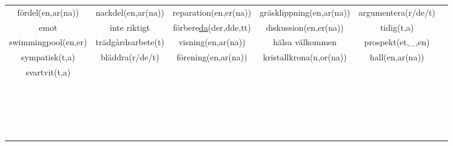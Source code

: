 \begin{center}
\begin{adjustwidth}{-2.5cm}{}
\begin{tabular}{|c c c c c c|}
            fördel(en,ar(na)) & nackdel(en,ar(na)) & reparation(en,er(na)) & gräsklippning(en,ar(na)) & argumentera(r/de/t) &  \\
            emot & inte riktigt & förbere\underline{da}(der,dde,tt) & diskussion(en,er(na)) & tidig(t,a) &  \\
            swimmingpool(en,er) & trädgårdsarbete(t) & visning(en,ar(na)) & hälsa välkommen & prospekt(et,\_,en) &  \\
            sympatisk(t,a) & bläddra(r/de/t) & förening(en,ar(na)) & kristallkrona(n,or(na)) & hall(en,ar(na)) &  \\
            svartvit(t,a) &  &  &  &  &  \\
             &  &  &  &  &  \\
             &  &  &  &  &  \\
             &  &  &  &  &  \\
             &  &  &  &  &  \\
             &  &  &  &  &  \\
             &  &  &  &  &  \\
             &  &  &  &  &  \\
             &  &  &  &  &  \\
             &  &  &  &  &  \\
             &  &  &  &  &  \\
             &  &  &  &  &  \\
             &  &  &  &  &  \\
             &  &  &  &  &  \\
             &  &  &  &  &  \\
             &  &  &  &  &  \\
             &  &  &  &  &  \\
             &  &  &  &  &  \\
             &  &  &  &  &  \\
             &  &  &  &  &  \\
            \hline
        \end{tabular}
    \end{adjustwidth}
\end{center}

